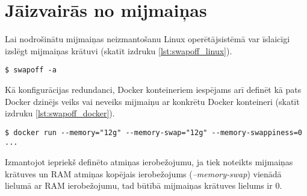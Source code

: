 \section{Jāizvairās no mijmaiņas}
Lai nodrošinātu mijmaiņas neizmantošanu Linux operētājsistēmā var īslaicīgi
izslēgt mijmaiņas krātuvi (skatīt izdruku \ref{lst:swapoff_linux}).
\begin{lstlisting}[caption={Mijmaiņas krātuves izlēgšana uz Linux}, label=lst:swapoff_linux]
$ swapoff -a
\end{lstlisting}

Kā konfigurācijas redundanci, Docker konteineriem iespējams arī definēt kā pats
Docker dzinējs veiks vai neveiks mijmaiņu ar konkrētu Docker konteineri (skatīt
izdruku \ref{lst:swapoff_docker}).

\begin{lstlisting}[caption={Mijmaiņas krātuves izlēgšana Docker konteinerim},
    label=lst:swapoff_docker]
$ docker run --memory="12g" --memory-swap="12g" --memory-swappiness=0 ...
\end{lstlisting}

Izmantojot iepriekš definēto atmiņas ierobežojumu, ja tiek noteikts mijmaiņas
krātuves un RAM atmiņas kopējais ierobežojums (\textit{--memory-swap}) vienādā
lielumā ar RAM ierobežojumu, tad būtībā mijmaiņas krātuves lielums ir 0.



